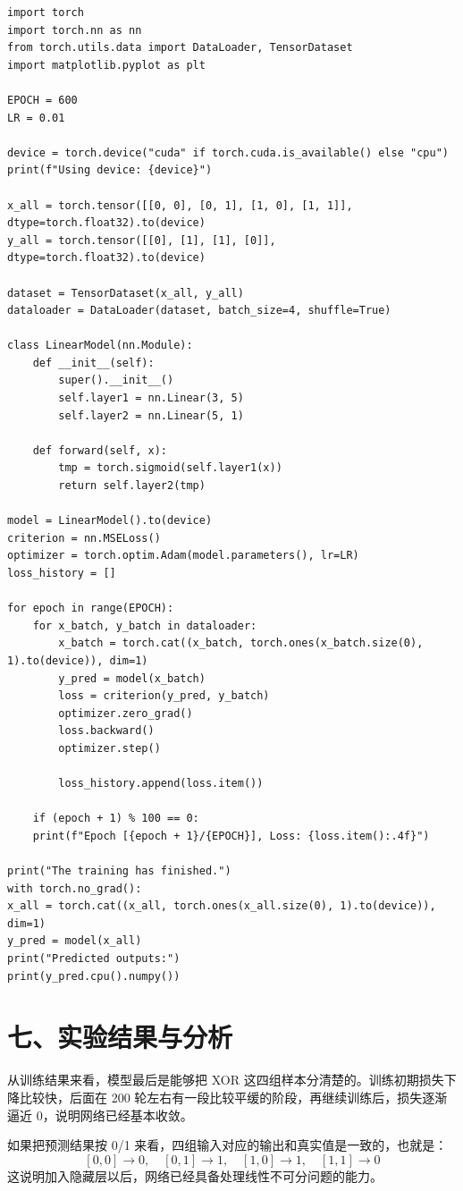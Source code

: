 \documentclass[12pt,a4paper]{ctexart}
\begin{document}
	\begin{lstlisting}
import torch
import torch.nn as nn
from torch.utils.data import DataLoader, TensorDataset
import matplotlib.pyplot as plt

EPOCH = 600
LR = 0.01

device = torch.device("cuda" if torch.cuda.is_available() else "cpu")
print(f"Using device: {device}")

x_all = torch.tensor([[0, 0], [0, 1], [1, 0], [1, 1]], dtype=torch.float32).to(device)
y_all = torch.tensor([[0], [1], [1], [0]], dtype=torch.float32).to(device)

dataset = TensorDataset(x_all, y_all)
dataloader = DataLoader(dataset, batch_size=4, shuffle=True)

class LinearModel(nn.Module):
	def __init__(self):
		super().__init__()
		self.layer1 = nn.Linear(3, 5)
		self.layer2 = nn.Linear(5, 1)
	
	def forward(self, x):
		tmp = torch.sigmoid(self.layer1(x))
		return self.layer2(tmp)

model = LinearModel().to(device)
criterion = nn.MSELoss()
optimizer = torch.optim.Adam(model.parameters(), lr=LR)
loss_history = []

for epoch in range(EPOCH):
	for x_batch, y_batch in dataloader:
		x_batch = torch.cat((x_batch, torch.ones(x_batch.size(0), 1).to(device)), dim=1)
		y_pred = model(x_batch)
		loss = criterion(y_pred, y_batch)
		optimizer.zero_grad()
		loss.backward()
		optimizer.step()
	
		loss_history.append(loss.item())
	
	if (epoch + 1) % 100 == 0:
	print(f"Epoch [{epoch + 1}/{EPOCH}], Loss: {loss.item():.4f}")

print("The training has finished.")
with torch.no_grad():
x_all = torch.cat((x_all, torch.ones(x_all.size(0), 1).to(device)), dim=1)
y_pred = model(x_all)
print("Predicted outputs:")
print(y_pred.cpu().numpy())
	\end{lstlisting}
	
	\section*{七、实验结果与分析}
	从训练结果来看，模型最后是能够把 XOR 这四组样本分清楚的。训练初期损失下降比较快，后面在 200 轮左右有一段比较平缓的阶段，再继续训练后，损失逐渐逼近 0，说明网络已经基本收敛。
	
	如果把预测结果按 0/1 来看，四组输入对应的输出和真实值是一致的，也就是：
	\[
	[0,0] \rightarrow 0,\quad [0,1] \rightarrow 1,\quad [1,0] \rightarrow 1,\quad [1,1] \rightarrow 0
	\]
	这说明加入隐藏层以后，网络已经具备处理线性不可分问题的能力。
	
\end{document}
